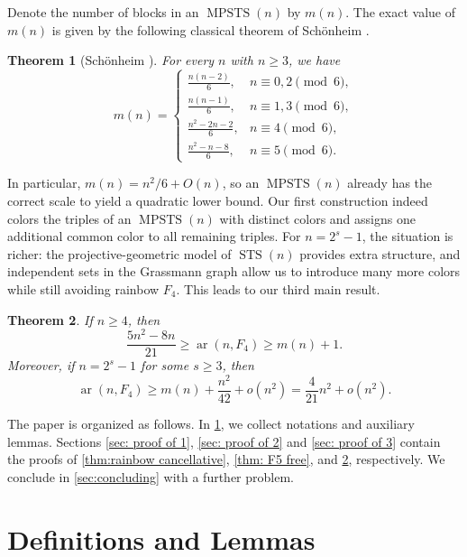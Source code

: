 \documentclass[10pt,a4paper]{article}
\newtheorem{theorem}{Theorem}[section]
\theoremstyle{definition}
\DeclareMathOperator{\ar}{ar}
\DeclareMathOperator{\STS}{STS}
\DeclareMathOperator{\MPSTS}{MPSTS}
\begin{document}
Denote the number of blocks in an $\MPSTS(n)$ by $m(n)$.
The exact value of $m(n)$ is given by the following classical theorem of Sch\"onheim \cite{schonheim1966}.
\begin{theorem}[Sch\"onheim \cite{schonheim1966}]
    For every $n$ with $n\ge3$, we have
    \begin{equation}\label{eq:Dv32-mod6}
        m(n)=
        \begin{cases}
            \frac{n(n-2)}{6},   & n\equiv 0,2 \pmod 6, \\%
            \frac{n(n-1)}{6},   & n\equiv 1,3 \pmod 6, \\%
            \frac{n^2-2n-2}{6}, & n\equiv 4 \pmod 6,   \\%
            \frac{n^2-n-8}{6},  & n\equiv 5 \pmod 6.
        \end{cases}
    \end{equation}
\end{theorem}
In particular, $m(n)=n^2/6+O(n)$, so an $\MPSTS(n)$ already has the correct scale to yield a quadratic lower bound.
Our first construction indeed colors the triples of an $\MPSTS(n)$ with distinct colors and assigns one additional common color to all remaining triples.
For $n=2^s-1$, the situation is richer: the projective-geometric model of $\STS(n)$ provides extra structure, and independent sets in the Grassmann graph allow us to introduce many more colors while still avoiding rainbow $F_4$.
This leads to our third main result.

\begin{theorem}\label{thm:F4}
    If $n\ge4$, then
    \[
        \frac{5n^2-8n}{21} \ge \ar(n,F_4) \ge m(n)+1.
    \]
    Moreover, if $n=2^s-1$ for some $s\ge3$, then
    \[
        \ar(n,F_4)\ge m(n)+\frac{n^2}{42}+o(n^2)=\frac{4}{21}n^2+o(n^2).
    \]
\end{theorem}



The paper is organized as follows.
In \cref{sec:def lem}, we collect notations and auxiliary lemmas.
Sections \ref{sec: proof of 1}, \ref{sec: proof of 2} and \ref{sec: proof of 3} contain the proofs of \cref{thm:rainbow cancellative}, \cref{thm: F5 free}, and \cref{thm:F4}, respectively.
We conclude in \cref{sec:concluding} with a further problem.


\section{Definitions and Lemmas}\label{sec:def lem}
\end{document}

